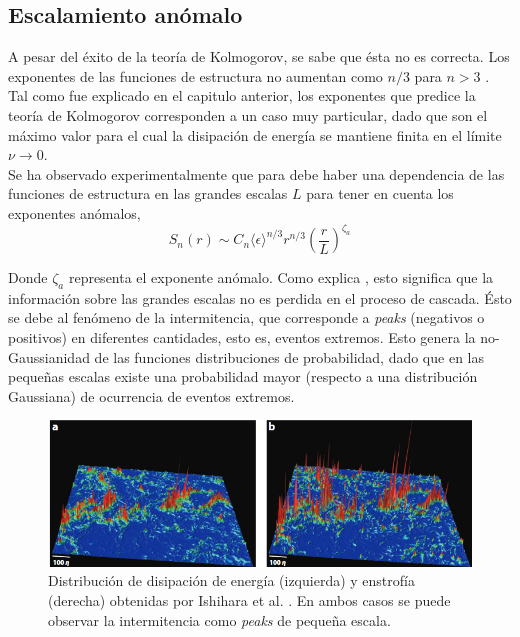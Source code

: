 \documentclass[executivepaper,12pt]{article}
\numberwithin{equation}{section}
\begin{document}
\subsection{Escalamiento anómalo}

A pesar del éxito de la teoría de Kolmogorov, se sabe que ésta no es correcta. Los exponentes de las funciones de estructura no aumentan como $n/3$ para $n>3$ \parencite{lvov1996}. Tal como fue explicado en el capitulo anterior, los exponentes que predice la teoría de Kolmogorov corresponden a un caso muy particular, dado que son el máximo valor para el cual la disipación de energía se mantiene finita en el límite $\nu\to0$. \\
Se ha observado experimentalmente \parencite{lvov1996} que para debe haber una dependencia de las funciones de estructura en las grandes escalas $L$ para tener en cuenta los exponentes anómalos,
\begin{equation*}
	S_n(r)\sim C_n \langle\epsilon\rangle^{n/3}r^{n/3}\left(\frac{r}{L}\right)^{\zeta_a}
\end{equation*} 

Donde $\zeta_a$ representa el exponente anómalo. Como explica \parencite{eyinkLecture}, esto significa que la información sobre las grandes escalas no es perdida en el proceso de cascada. Ésto se debe al fenómeno de la intermitencia, que corresponde a \textit{peaks} (negativos o positivos) en diferentes cantidades, esto es, eventos extremos. Esto genera la no-Gaussianidad de las funciones distribuciones de probabilidad, dado que en las pequeñas escalas existe una probabilidad mayor (respecto a una distribución Gaussiana) de ocurrencia de eventos extremos.  

\begin{figure}[H]
	\begin{center}
		\includegraphics[scale=0.75]{interm1}
	\end{center}
	\caption{Distribución de disipación de energía (izquierda) y enstrofía (derecha) obtenidas por Ishihara et al. \parencite{ishihara2009}. En ambos casos se puede observar la intermitencia como \textit{peaks} de pequeña escala. }
	\label{fig-interm1}
\end{figure}
\end{document}
